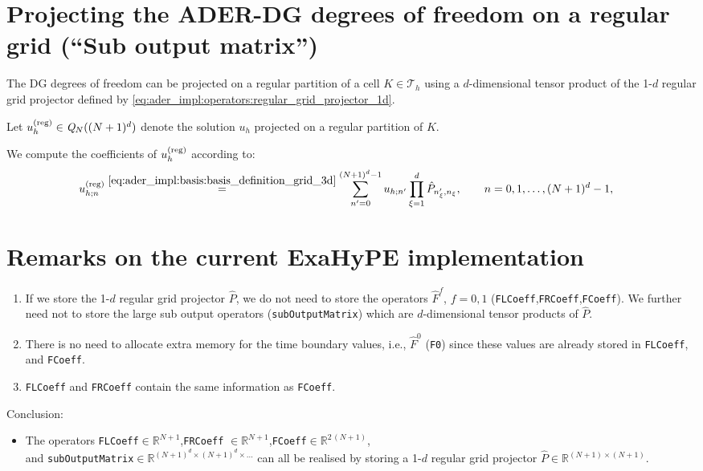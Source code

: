 \documentclass{scrreprt}
\theoremstyle{definition}
\theoremstyle{nonumberplain}
\newcommand{\tria}{\mathcal{T}_h}
\newcommand{\cell}{K}
\newcommand{\polyspace}[3]{\mathit{#1}_{#2}(#3)}
\begin{document}
\section{Projecting the ADER-DG degrees of freedom on a regular grid (``Sub
output matrix'')}
The DG degrees of freedom can be projected on a regular partition
of a cell $\cell\in\tria$
using a $d$-dimensional tensor product of the 1-$d$
regular grid projector defined
by \eqref{eq:ader_impl:operators:regular_grid_projector_1d}.
 
Let $u_h^{(\textup{reg})}\in\polyspace{Q}{N}{{(N+1)^d}}$ denote the
solution $u_h$ projected on a regular partition of $\cell$.

We compute the coefficients of $u_h^{(\textup{reg})}$
according to:
\begin{align}
u_{h;n}^{(\textup{reg})}
&\overset{\eqref{eq:ader_impl:basis:basis_definition_grid_3d}}
{=}
\sum_{n'=0}^{(N+1)^d-1}
u_{h;n'}
\prod_{\xi=1}^{d}
\hat{P}_{n'_\xi,n_{\xi}}
,
\qquad n=0,1,\ldots,(N+1)^d-1,
\end{align}

\section{Remarks on the current ExaHyPE implementation}
\begin{enumerate}
\item If we store the 1-$d$ regular grid projector $\hat{P}$, we
do not need to store the operators $\hat{F}^f$, $f=0,1$
(\texttt{FLCoeff},\texttt{FRCoeff},\texttt{FCoeff}).
We further need not to store the large sub output operators
(\texttt{subOutputMatrix})
which are $d$-dimensional tensor products of $\hat{P}$.
\item There is no need to allocate extra memory for the time 
boundary values, i.e., $\hat{F}^0$ (\texttt{F0})
since these values are already stored
in \texttt{FLCoeff}, and \texttt{FCoeff}. 
\item \texttt{FLCoeff} and \texttt{FRCoeff}  
contain the same information as \texttt{FCoeff}. 
\end{enumerate}

Conclusion:
\begin{itemize}
\item
The operators
\texttt{FLCoeff}$\in\mathbb{R}^{N+1}$,\texttt{FRCoeff}
$\in\mathbb{R}^{N+1}$,\texttt{FCoeff}$\in\mathbb{R}^{2\,(N+1)}$,\\
and \texttt{subOutputMatrix}$\in\mathbb{R}^{(N+1)^d\times(N+1)^d\times\ldots}$
can all be realised by storing a 1-$d$ regular grid projector
$\hat{P}\in\mathbb{R}^{(N+1)\times(N+1)}$.
\end{itemize}
\end{document}
